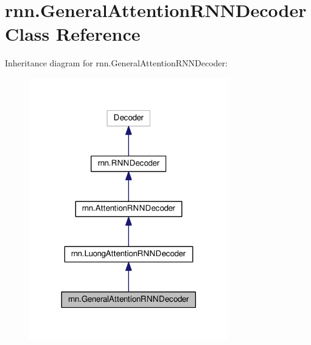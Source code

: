 \hypertarget{classrnn_1_1GeneralAttentionRNNDecoder}{}\section{rnn.\+General\+Attention\+R\+N\+N\+Decoder Class Reference}
\label{classrnn_1_1GeneralAttentionRNNDecoder}


Inheritance diagram for rnn.\+General\+Attention\+R\+N\+N\+Decoder\+:
\nopagebreak
\begin{figure}[H]
\begin{center}
\leavevmode
\includegraphics[width=245pt]{classrnn_1_1GeneralAttentionRNNDecoder__inherit__graph}
\end{center}
\end{figure}


